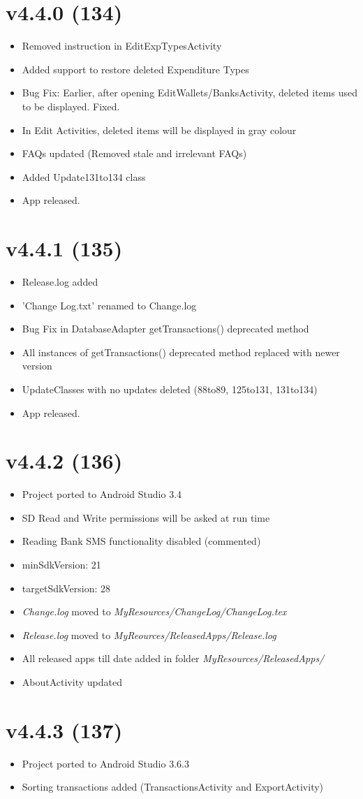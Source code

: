 \documentclass{article}
\begin{document}
\section{v4.4.0 (134)}
\begin{itemize}
\item Removed instruction in EditExpTypesActivity
\item Added support to restore deleted Expenditure Types
\item Bug Fix: Earlier, after opening EditWallets/BanksActivity, deleted items used to be displayed. Fixed.
\item In Edit Activities, deleted items will be displayed in gray colour
\item FAQs updated (Removed stale and irrelevant FAQs)
\item Added Update131to134 class
\item App released.
\end{itemize}

\section{v4.4.1 (135)}
\begin{itemize}
\item Release.log added
\item 'Change Log.txt' renamed to Change.log
\item Bug Fix in DatabaseAdapter getTransactions() deprecated method
\item All instances of getTransactions() deprecated method replaced with newer version
\item UpdateClasses with no updates deleted (88to89, 125to131, 131to134)
\item App released.
\end{itemize}

\section{v4.4.2 (136)}
\begin{itemize}
\item Project ported to Android Studio 3.4
\item SD Read and Write permissions will be asked at run time
\item Reading Bank SMS functionality disabled (commented)
\item minSdkVersion: 21
\item targetSdkVersion: 28
\item \textit{Change.log} moved to \textit{MyResources/ChangeLog/ChangeLog.tex}
\item \textit{Release.log} moved to \textit{MyReources/ReleasedApps/Release.log}
\item All released apps till date added in folder \textit{MyResources/ReleasedApps/}
\item AboutActivity updated
\end{itemize}

\section{v4.4.3 (137)}
\begin{itemize}
\item Project ported to Android Studio 3.6.3
\item Sorting transactions added (TransactionsActivity and ExportActivity)
\end{itemize}
\end{document}

